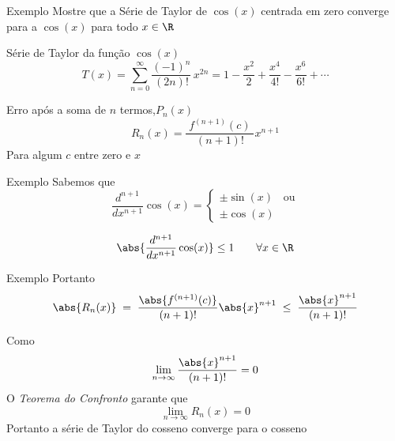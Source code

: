 \addtocounter{exemplo}{1}
\begin{frame}{Exemplo \theexemplo}
  Mostre que a Série de Taylor de \(\cos(x)\) centrada em zero
  converge para a \(\cos(x)\) para todo
  \(x\in\R\)

  \pause
  \vspace{\baselineskip}
  Série de Taylor da função \(\cos(x)\)
  \[
    T(x)
    = \sum_{n=0}^{\infty} \frac{(-1)^n}{(2n)!}\, x^{2n}
    = 1 - \frac{x^2}{2}
    + \frac{x^4}{4!}
    - \frac{x^6}{6!}
    + \cdots
  \]

  \pause
  Erro após a soma de $n$ termos,\(P_n(x)\)
  \[
    R_n(x) = \frac{\;f^{(n+1)}(c)\;}{(n+1)!}x^{n+1}
  \]
  Para algum $c$ entre zero e $x$
\end{frame}

\begin{frame}{Exemplo \theexemplo}
  Sabemos que
  \[
    \frac{d^{n+1}}{dx^{n+1}} \cos(x)
    = \begin{cases}
       \pm \sin(x) & \text{ou} \\
       \pm \cos(x)
    \end{cases}
  \]

  \pause
  \vspace{\baselineskip}
  \[
    \abs{\frac{d^{n+1}}{dx^{n+1}} \cos(x)} \leq 1
    \qquad
    \forall x\in\R
  \]
\end{frame}

\begin{frame}{Exemplo \theexemplo}
  Portanto
  \[
    \abs{R_n(x)}
    \;=\;    \frac{\abs{f^{(n+1)}(c)}}{(n+1)!}\abs{x}^{n+1}
    \;\leq\; \frac{\abs{x}^{n+1}}{(n+1)!}
  \]

  \pause
  Como
  \[
    \lim_{n\to\infty} \frac{\abs{x}^{n+1}}{(n+1)!} = 0
  \]
  \pause
  O \emph{Teorema do Confronto} garante que
  \[
    \lim_{n\to\infty} R_n(x) = 0
  \]
  \pause
  Portanto a série de Taylor do cosseno converge para o cosseno
\end{frame}

\begin{frame}{\contentsname}
  \tableofcontents
\end{frame}


